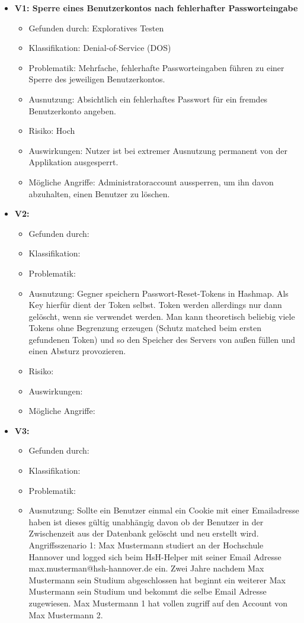 \documentclass[12pt,DIV14,BCOR10mm,a4paper,parskip=half-,headsepline,headinclude,english,ngerman,bibliography=totocnumbered]{scrreprt}
\begin{document}
\begin{itemize}

  \hypertarget{vulnerability1}{}
  \item \textbf{V1: Sperre eines Benutzerkontos nach fehlerhafter Passworteingabe}
  \begin{itemize}
  \item Gefunden durch: Exploratives Testen
  \item Klassifikation: Denial-of-Service (DOS)
  \item Problematik: Mehrfache, fehlerhafte Passworteingaben führen zu einer Sperre des jeweiligen Benutzerkontos.
  \item Ausnutzung: Absichtlich ein fehlerhaftes Passwort für ein fremdes Benutzerkonto angeben.
  \item Risiko: Hoch
  \item Auswirkungen: Nutzer ist bei extremer Ausnutzung permanent von der Applikation ausgesperrt. 
  \item Mögliche Angriffe: Administratoraccount aussperren, um ihn davon abzuhalten, einen Benutzer zu löschen.
  \end{itemize}

  \hypertarget{vulnerability2}{}
  \item \textbf{V2: }
  \begin{itemize}
  \item Gefunden durch:
  \item Klassifikation: 
  \item Problematik:
  \item Ausnutzung: Gegner speichern Passwort-Reset-Tokens in Hashmap. Als Key hierfür dient der Token selbst. Token werden allerdings nur dann gelöscht, wenn sie verwendet werden. Man kann theoretisch beliebig viele Tokens ohne Begrenzung erzeugen (Schutz matched beim ersten gefundenen Token) und so den Speicher des Servers von außen füllen und einen Absturz provozieren.
  \item Risiko: 
  \item Auswirkungen: 
  \item Mögliche Angriffe:
  \end{itemize}

  \hypertarget{vulnerability3}{}
  \item \textbf{V3: }
  \begin{itemize}
  \item Gefunden durch:
  \item Klassifikation: 
  \item Problematik:
  \item Ausnutzung: Sollte ein Benutzer einmal ein Cookie mit einer Emailadresse haben ist dieses gültig unabhängig davon ob der Benutzer in der Zwischenzeit aus der Datenbank gelöscht und neu erstellt wird. 
    Angriffsszenario 1: Max Mustermann studiert an der Hochschule Hannover und logged sich beim HsH-Helper mit seiner Email Adresse max.musterman@hsh-hannover.de ein. Zwei Jahre nachdem Max Mustermann sein Studium abgeschlossen hat beginnt ein weiterer Max Mustermann sein Studium und bekommt die selbe Email Adresse zugewiesen. Max Mustermann 1 hat vollen zugriff auf den Account von Max Mustermann 2. 


\end{itemize}
\end{itemize}
\end{document}
